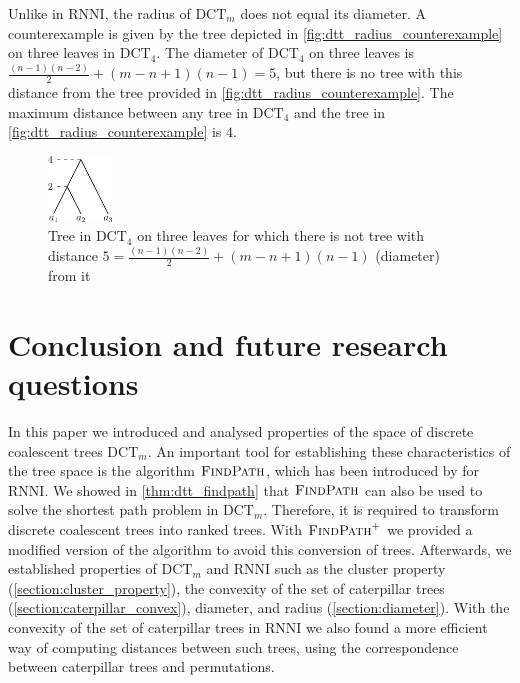 \documentclass[11pt]{amsart}
\newcommand{\rnni}{\mathrm{RNNI}}
\newcommand{\findpath}{\textsc{FindPath}}
\newcommand{\dct}{\mathrm{DCT}}
\newcommand{\summary}[1]{} %
\begin{document}
Unlike in $\rnni$, the radius of $\dct_m$ does not equal its diameter.
A counterexample is given by the tree depicted in \autoref{fig:dtt_radius_counterexample} on three leaves in $\dct_4$.
The diameter of $\dct_4$ on three leaves is $\frac{(n-1)(n-2)}{2} + (m-n+1)(n-1) = 5$, but there is no tree with this distance from the tree provided in \autoref{fig:dtt_radius_counterexample}.
The maximum distance between any tree in $\dct_4$ and the tree in \autoref{fig:dtt_radius_counterexample} is $4$.

\begin{figure}[ht]
	\includegraphics[width=0.15\textwidth]{dtt_radius_counterexample.eps}
	\caption{Tree in $\dct_4$ on three leaves for which there is not tree with distance $5 = \frac{(n-1)(n-2)}{2} + (m-n+1)(n-1)$ (diameter) from it}
	\label{fig:dtt_radius_counterexample}
\end{figure}


\section{Conclusion and future research questions}
\label{section:open_problems}

\summary{Brief summary of results of the paper}
In this paper we introduced and analysed properties of the space of discrete coalescent trees $\dct_m$.
An important tool for establishing these characteristics of the tree space is the algorithm $\findpath$, which has been introduced by \textcite{Collienne2021} for $\rnni$.
We showed in \autoref{thm:dtt_findpath} that $\findpath$ can also be used to solve the shortest path problem in $\dct_m$.
Therefore, it is required to transform discrete coalescent trees into ranked trees.
With $\findpath^+$ we provided a modified version of the algorithm to avoid this conversion of trees.
Afterwards, we established properties of $\dct_m$ and $\rnni$ such as the cluster property (\autoref{section:cluster_property}), the convexity of the set of caterpillar trees (\autoref{section:caterpillar_convex}), diameter, and radius (\autoref{section:diameter}).
With the convexity of the set of caterpillar trees in $\rnni$ we also found a more efficient way of computing distances between such trees, using the correspondence between caterpillar trees and permutations.
\end{document}
